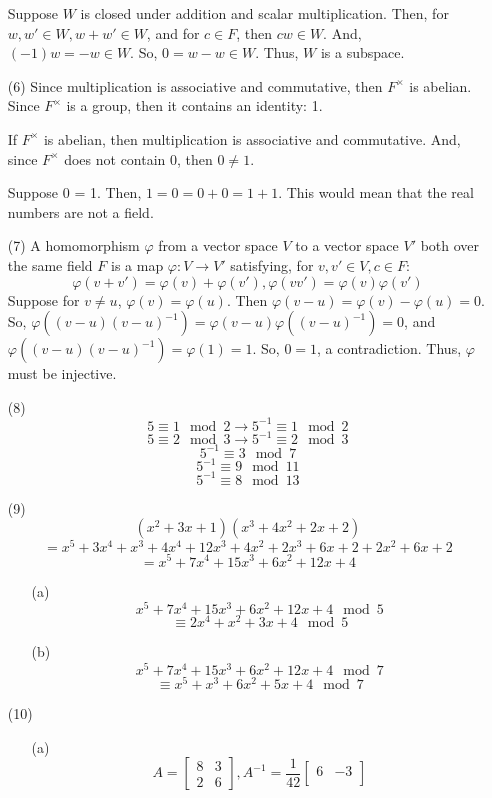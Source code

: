 \documentclass[12pt]{article}
\begin{document}
\begin{itemize}
Suppose $W$ is closed under addition and scalar multiplication. Then, for $w, w' \in W, w + w' \in W$, and for $c \in F$, then $cw \in W$. And, $(-1)w = -w \in W$. So, $0 = w - w \in W$. Thus, $W$ is a subspace.
\item[(6)]
Since multiplication is associative and commutative, then $F^\times$ is abelian. Since $F^\times$ is a group, then it contains an identity: 1.

If $F^\times$ is abelian, then multiplication is associative and commutative. And, since $F^\times$ does not contain 0, then $0 \neq 1$.

Suppose 0 = 1. Then, $1 = 0 = 0 + 0 = 1 + 1$. This would mean that the real numbers are not a field.
\item[(7)]
A homomorphism $\varphi$ from a vector space $V$ to a vector space $V'$ both over the same field $F$ is a map $\varphi: V \rightarrow V'$ satisfying, for $v, v' \in V, c \in F$:
$$\varphi(v + v') = \varphi(v) + \varphi(v'), \varphi(vv') = \varphi(v)\varphi(v')$$
Suppose for $v \neq u$, $\varphi(v) = \varphi(u)$. Then $\varphi(v - u) = \varphi(v) - \varphi(u) = 0$. So, $\varphi((v - u)(v - u)^{-1}) = \varphi(v-u)\varphi((v-u)^{-1}) = 0$, and $\varphi((v - u)(v - u)^{-1}) = \varphi(1) = 1$. So, $0 = 1$, a contradiction. Thus, $\varphi$ must be injective.
\item[(8)]
$$5 \equiv 1 \mod 2 \rightarrow 5^{-1} \equiv 1 \mod 2$$
$$5 \equiv 2 \mod 3 \rightarrow 5^{-1} \equiv 2 \mod 3$$
$$5^{-1} \equiv 3 \mod 7$$
$$5^{-1} \equiv 9 \mod 11$$
$$5^{-1} \equiv 8 \mod 13$$
\item[(9)]
$$(x^2 + 3x + 1)(x^3 + 4x^2 + 2x + 2)$$
$$= x^5 + 3x^4 + x^3 + 4x^4 + 12x^3 + 4x^2 + 2x^3 + 6x + 2 + 2x^2 + 6x + 2$$
$$= x^5 + 7x^4 + 15x^3 + 6x^2 + 12x + 4$$
\begin{itemize}
\item[(a)]
$$x^5 + 7x^4 + 15x^3 + 6x^2 + 12x + 4 \mod 5$$
$$\equiv 2x^4 + x^2 + 3x + 4 \mod 5$$
\item[(b)]
$$x^5 + 7x^4 + 15x^3 + 6x^2 + 12x + 4 \mod 7$$
$$\equiv x^5 + x^3 + 6x^2 + 5x + 4 \mod 7$$
\end{itemize}
\item[(10)]
\begin{itemize}
\item[(a)]
$$A = \begin{bmatrix}
8 & 3 \\
2 & 6
\end{bmatrix}, A^{-1} = \frac{1}{42}\begin{bmatrix}
6 & -3 \\

\end{bmatrix}$$
\end{itemize}
\end{itemize}
\end{document}
